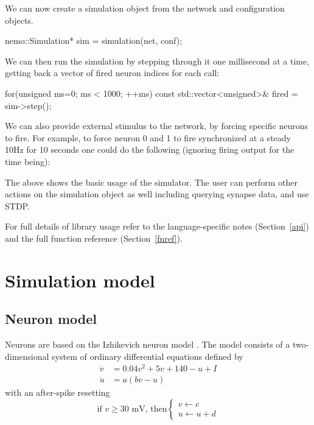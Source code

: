 \documentclass[a4paper]{article}
\begin{document}
We can now create a simulation object from the network and configuration objects.

\begin{ccode}
nemo::Simulation* sim = simulation(net, conf); 
\end{ccode}

We can then run the simulation by stepping through it one millisecond at a time,
getting back a vector of fired neuron indices for each call:

\begin{ccode}
for(unsigned ms=0; ms < 1000; ++ms) {
	const std::vector<unsigned>& fired = sim->step();
}
\end{ccode}

We can also provide external stimulus to the network, by forcing specific neurons to fire.
For example, to force neuron 0 and 1 to fire synchronized at a steady 10Hz for 10 seconds
	one could do the following (ignoring firing output for the time being):


The above shows the basic usage of the simulator.
The user can perform other actions on the simulation object as well
	including querying synapse data,
	and use STDP.

For full details of library usage refer to the
	language-specific notes (Section~\ref{api})
	and the full function reference (Section~\ref{fnref}).

\section{Simulation model}
\label{model}

\subsection{Neuron model}
\label{model:neuron}

Neurons are based on the Izhikevich neuron model \cite{izhikevich2003simple_model}.
The model consists of a two-dimensional system of ordinary differential equations defined by
\begin{align}
	\dot{v} & = 0.04v^2+5v+140-u+I    \label{eq:update_v} \\
	\dot{u} & = a(bv-u)               \label{eq:update_u}
\end{align}
with an after-spike resetting
\begin{equation}
\label{eq:reset}
\text{if }v\ge30\text{ mV, then}\begin{cases}v\leftarrow c\\u\leftarrow u+d\end{cases}
\end{equation}
\end{document}
